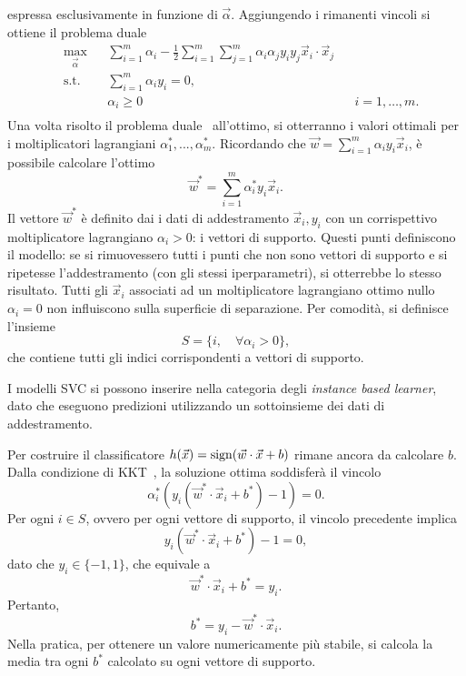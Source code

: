 espressa esclusivamente in funzione di $\Vec{\alpha}$.
Aggiungendo i rimanenti vincoli si ottiene il problema duale
\begin{equation}\label{eq:svc:hardmargin:wolfe_dual}
\begin{aligned}
& \max_{\vec\alpha}     && \sum_{i=1}^{m}\alpha_i - \frac{1}{2}\sum_{i=1}^{m}\sum_{j=1}^{m}\alpha_i\alpha_jy_iy_j\Vec{x}_i\cdot\Vec{x}_j\\
& \textrm{s.t.}     && \sum_{i=1}^{m} \alpha_iy_i = 0, \\
&                   && \alpha_i \geq 0 && i=1,\dots,m. \\
\end{aligned}
\end{equation}
%
Una volta risolto il problema duale~ all'ottimo, si otterranno i valori ottimali per i moltiplicatori lagrangiani $\alpha_1^*, ..., \alpha_m^*$.
Ricordando che $\Vec{w} = \sum_{i=1}^{m}\alpha_iy_i\Vec{x}_i$, è possibile calcolare l'ottimo 
\begin{equation}\label{eq:representer_w} %
\Vec{w}^* = \sum_{i=1}^{m}\alpha_i^*y_i\Vec{x}_i.
\end{equation}
Il vettore $\Vec{w}^*$ è definito dai i dati di addestramento $\Vec{x}_i, y_i$ con un corrispettivo moltiplicatore lagrangiano $\alpha_i > 0$: i vettori di supporto. 
Questi punti definiscono il modello: se si rimuovessero tutti i punti che non sono vettori di supporto e si ripetesse l'addestramento (con gli stessi iperparametri), si otterrebbe lo stesso risultato.
Tutti gli $\Vec{x}_i$ associati ad un moltiplicatore lagrangiano ottimo nullo $\alpha_i=0$ non influiscono sulla superficie di separazione.
Per comodità, si definisce l'insieme
\begin{equation*}
    S = \{i,\quad\forall\alpha_i >0\},   
\end{equation*}
che contiene tutti gli indici corrispondenti a vettori di supporto.

I modelli SVC si possono inserire nella categoria degli \emph{instance based learner}, dato che eseguono predizioni utilizzando un sottoinsieme dei dati di addestramento.

Per costruire il classificatore $h(\Vec{x}) = \mathrm{sign}(\Vec{w}\cdot \Vec{x} +b)$ rimane ancora da calcolare $b$.  Dalla condizione di KKT~, la soluzione ottima soddisferà il vincolo 
\begin{equation*}
\alpha_i^*(y_i(\Vec{w}^*\cdot\Vec{x}_i+b^*)-1)=0.
\end{equation*}
Per ogni $i \in S$, ovvero per ogni vettore di supporto, il vincolo precedente implica  
\begin{equation*}
y_i(\Vec{w}^*\cdot\Vec{x}_i+b^*) -1 = 0,
\end{equation*}
dato che $y_i \in \{-1,1\}$, che equivale a
\begin{equation*}
\Vec{w}^*\cdot\Vec{x}_i+b^*=y_i.
\end{equation*}
Pertanto,
\begin{equation*}
b^*=y_i - \Vec{w}^*\cdot\Vec{x}_i.
\end{equation*} 
Nella pratica, per ottenere un valore numericamente più stabile, si calcola la media tra ogni $b^*$ calcolato su ogni vettore di supporto.

